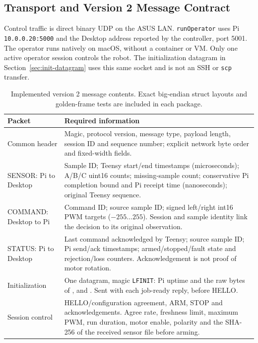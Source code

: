 \subsection{Transport and Version 2 Message Contract}
Control traffic is direct binary UDP on the ASUS LAN. \texttt{runOperator} uses Pi \texttt{10.0.0.20:5000} and the Desktop address reported by the controller, port 5001. The operator runs natively on macOS, without a container or VM. Only one active operator session controls the robot. The initialization datagram in Section~\ref{sec:init-datagram} uses this same socket and is not an SSH or \texttt{scp} transfer.

\begin{table}[H]
\centering\small
\caption{Implemented version 2 message contents. Exact big-endian struct layouts and golden-frame tests are included in each package.}
\label{tab:remote-messages}
\begin{tabular}{@{}L{3.3cm}L{12.9cm}@{}}
\toprule
Packet & Required information \\
\midrule
Common header & Magic, protocol version, message type, payload length, session ID and sequence number; explicit network byte order and fixed-width fields. \\
SENSOR: Pi to Desktop & Sample ID; Teensy start/end timestamps (microseconds); A/B/C uint16 counts; missing-sample count; conservative Pi completion bound and Pi receipt time (nanoseconds); original Teensy sequence. \\
COMMAND: Desktop to Pi & Command ID; source sample ID; signed left/right int16 PWM targets ($-255\ldots255$). Session and sample identity link the decision to its original observation. \\
STATUS: Pi to Desktop & Last command acknowledged by Teensy; source sample ID; Pi send/ack timestamps; armed/stopped/fault state and rejection/loss counters. Acknowledgement is not proof of motor rotation. \\
Initialization & One datagram, magic \texttt{LFINIT}: Pi uptime and the raw bytes of ,  and . Sent with each job-ready reply, before HELLO. \\
Session control & HELLO/configuration agreement, ARM, STOP and acknowledgements. Agree rate, freshness limit, maximum PWM, run duration, motor enable, polarity and the SHA-256 of the received sensor file before arming. \\
\bottomrule
\end{tabular}
\end{table}

